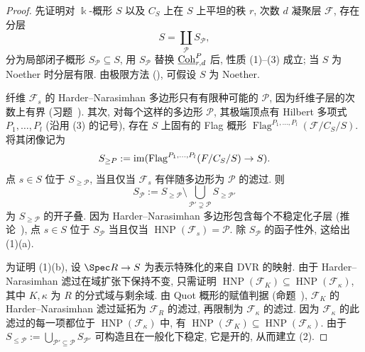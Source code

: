 \begin{proof}
先证明对 $\Bbbk$-概形 $S$ 以及 $C_S$ 上在 $S$ 上平坦的秩 $r$, 次数 $d$ 凝聚层 $\mathcal F$, 存在分层
\[
S=\coprod_{\mathcal P}S_{\mathcal P},
\]
分为局部闭子概形 $S_{\mathcal P}\subseteq S$, 用 $S_{\mathcal P}$ 替换 $\underline{\mathrm{Coh}}_{r,d}^{P}$ 后, 性质 (1)--(3) 成立; 当 $S$ 为 Noether 时分层有限. 由极限方法 (), 可假设 $S$ 为 Noether.

纤维 $\mathcal F_s$ 的 Harder--Narasimhan 多边形只有有限种可能的 $\mathcal P$, 因为纤维子层的次数上有界 (习题~). 其次, 对每个这样的多边形 $\mathcal P$, 其极端顶点有 Hilbert 多项式 $P_1,\ldots,P_l$ (沿用 (3) 的记号), 存在 $S$ 上固有的 Flag 概形 $\operatorname{Flag}^{P_1,\ldots,P_l}(\mathcal F/C_S/S)$. 将其闭像记为
\[
S_{\geq P}:=\operatorname{im}(\operatorname{Flag}^{P_1,\ldots,P_l}(F/C_S/S)\to S).
\]
点 $s\in S$ 位于 $S_{\geq\mathcal P}$, 当且仅当 $\mathcal F_s$ 有伴随多边形为 $\mathcal P$ 的滤过. 则
\[
S_{\mathcal P}:=S_{\geq\mathcal P}\setminus\bigcup_{\mathcal P'\supsetneq\mathcal P}S_{\geq\mathcal P'}
\]
为 $S_{\geq\mathcal P}$ 的开子叠. 因为 Harder--Narasimhan 多边形包含每个不稳定化子层 (推论~), 点 $s\in S$ 位于 $S_{\mathcal P}$ 当且仅当 $\operatorname{HNP}(\mathcal F_s)=\mathcal P$. 除 $S_{\mathcal P}$ 的函子性外, 这给出 (1)(a).

为证明 (1)(b), 设 $\Spec R\to S$ 为表示特殊化的来自 DVR 的映射. 由于 Harder--Narasimhan 滤过在域扩张下保持不变, 只需证明 $\operatorname{HNP}(\mathcal F_K)\subseteq\operatorname{HNP}(\mathcal F_\kappa)$, 其中 $K,\kappa$ 为 $R$ 的分式域与剩余域. 由 Quot 概形的赋值判据 (命题~), $\mathcal F_K$ 的 Harder--Narasimhan 滤过延拓为 $\mathcal F_R$ 的滤过, 再限制为 $\mathcal F_\kappa$ 的滤过. 因为 $\mathcal F_\kappa$ 的此滤过的每一项都位于 $\operatorname{HNP}(\mathcal F_\kappa)$ 中, 有 $\operatorname{HNP}(\mathcal F_K)\subseteq\operatorname{HNP}(\mathcal F_\kappa)$. 由于 $S_{\leq\mathcal P}:=\bigcup_{\mathcal P'\subseteq\mathcal P}S_{\mathcal P'}$ 可构造且在一般化下稳定, 它是开的, 从而建立 (2).


\end{proof}
